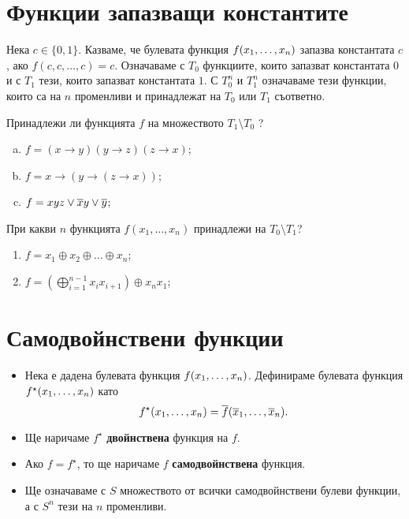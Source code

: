\section{Функции запазващи константите}

Нека $c\in\{0,1\}$. Казваме, че булевата функция $f(x_{1},\dots,x_{n})$ запазва константата $c$, ако $f(c,c,\dots,c) = c$.
Означаваме с $T_0$ функциите, които запазват константата $0$ и с $T_1$ тези, които запазват константата $1$.
С $T^n_0$ и $T^n_1$ означаваме тези функции, които са на $n$ променливи и принадлежат на $T_0$ или $T_1$ съответно.

\begin{problem}%
  Принадлежи ли функцията $f$ на множеството $T_1 \setminus T_0$ ?
  \begin{enumerate}[a)]
  \item
    $f = (x\rightarrow y)(y\rightarrow z)(z\rightarrow x)$;
  \item
    $f = x\rightarrow(y\rightarrow (z\rightarrow x))$;
  \item
    $f = xyz \vee \overline{x}y \vee \overline{y}$;
  \end{enumerate}
\end{problem}

\begin{problem}
  При какви $n$ функцията $f(x_1,\dots, x_n)$ принадлежи на $T_0\setminus T_1$?
  \begin{enumerate}[1)]
  \item
    $f = x_1\oplus x_2 \oplus\dots\oplus x_n$;
  \item
    $f = (\bigoplus^{n-1}_{i=1} x_ix_{i+1})\oplus x_nx_1$;
  \end{enumerate}
\end{problem}

\section{Самодвойнствени функции}

\begin{itemize}
\item 
  Нека е дадена булевата функция $f(x_{1},\dots,x_{n})$. Дефинираме булевата функция $f^\star(x_{1},\dots,x_{n})$ като
  \[f^\star(x_{1},\dots,x_{n}) = \overline{f}(\overline{x}_1,\dots,\overline{x}_n).\]
\item
  Ще наричаме $f^\star$ {\bf двойнствена} функция на $f$.
\item
  Ако $f = f^\star$, то ще наричаме $f$ {\bf самодвойнствена} функция.
\item
  Ще означаваме с $S$ множеството от всички самодвойнствени булеви функции, а с $S^n$ тези на $n$ променливи.
\end{itemize}

